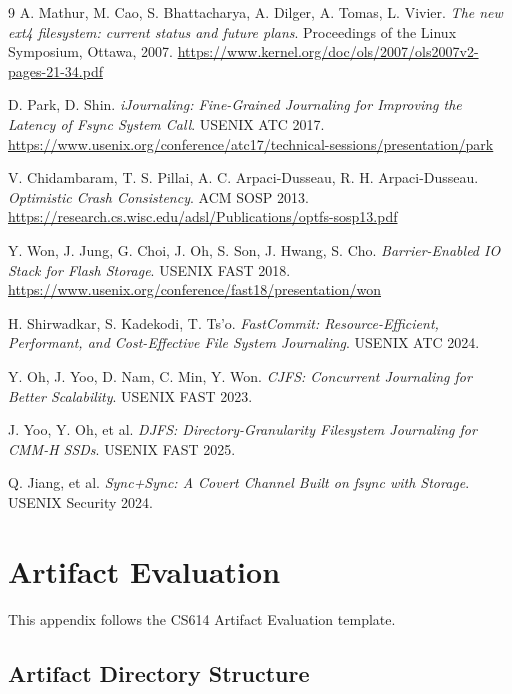 \documentclass[11pt,a4paper]{article}
\begin{document}
\begin{thebibliography}{9}
A. Mathur, M. Cao, S. Bhattacharya, A. Dilger, A. Tomas, L. Vivier.
\textit{The new ext4 filesystem: current status and future plans}.
Proceedings of the Linux Symposium, Ottawa, 2007.
\url{https://www.kernel.org/doc/ols/2007/ols2007v2-pages-21-34.pdf}

D. Park, D. Shin.
\textit{iJournaling: Fine-Grained Journaling for Improving the
Latency of Fsync System Call}.
USENIX ATC 2017.
\url{https://www.usenix.org/conference/atc17/technical-sessions/presentation/park}

V. Chidambaram, T. S. Pillai, A. C. Arpaci-Dusseau, R. H.
Arpaci-Dusseau.
\textit{Optimistic Crash Consistency}.
ACM SOSP 2013.
\url{https://research.cs.wisc.edu/adsl/Publications/optfs-sosp13.pdf}

Y. Won, J. Jung, G. Choi, J. Oh, S. Son, J. Hwang, S. Cho.
\textit{Barrier-Enabled IO Stack for Flash Storage}.
USENIX FAST 2018.
\url{https://www.usenix.org/conference/fast18/presentation/won}

H. Shirwadkar, S. Kadekodi, T. Ts'o.
\textit{FastCommit: Resource-Efficient, Performant, and
Cost-Effective File System Journaling}.
USENIX ATC 2024.

Y. Oh, J. Yoo, D. Nam, C. Min, Y. Won.
\textit{CJFS: Concurrent Journaling for Better Scalability}.
USENIX FAST 2023.

J. Yoo, Y. Oh, et al.
\textit{DJFS: Directory-Granularity Filesystem Journaling for
CMM-H SSDs}.
USENIX FAST 2025.

Q. Jiang, et al.
\textit{Sync+Sync: A Covert Channel Built on fsync with Storage}.
USENIX Security 2024.
\end{thebibliography}


\appendix
\clearpage
\section{Artifact Evaluation}

This appendix follows the CS614 Artifact Evaluation template.

\subsection{Artifact Directory Structure}
\end{document}

